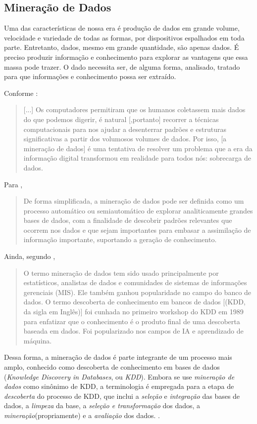 \subsection{Mineração de Dados}\label{mineracao_dados}
Uma das características de nossa era é produção de dados em grande volume, velocidade e variedade de todas as formas, por dispositivos espalhados em toda parte. Entretanto, dados, mesmo em grande quantidade, são apenas dados. É preciso produzir informação e conhecimento para explorar as vantagens que essa massa pode trazer. O dado necessita ser, de alguma forma, analisado, tratado para que informações e conhecimento possa ser extraído. \cite{aprenda_mineracao_fernando_amaral16} \cite{ferrari2017}

Conforme \cite{fayyad1996}:
\begin{quotation}
	[...] Os computadores permitiram que os humanos coletassem mais dados do que podemos digerir, é natural [,portanto] recorrer a técnicas computacionais para nos ajudar a desenterrar padrões e estruturas significativas a partir dos volumosos volumes de dados. Por isso, [a mineração de dados] é uma tentativa de resolver um problema que a era da informação digital transformou em realidade para todos nós: sobrecarga de dados.
\end{quotation}

Para \cite{Boscarioli2017},
\begin{quotation}
	De forma simplificada, a mineração de dados pode ser definida como um processo automático ou semiautomático de explorar analiticamente grandes bases de dados, com a finalidade de descobrir padrões relevantes que ocorrem nos dados e que sejam importantes para embasar a assimilação de informação importante, suportando a geração de conhecimento. 
\end{quotation}

Ainda, segundo \cite{fayyad1996}, 
\begin{quotation}
	O termo mineração de dados tem sido usado principalmente por estatísticos, analistas de dados e comunidades de sistemas de informações gerenciais (MIS). Ele também ganhou popularidade no campo do banco de dados. O termo descoberta de conhecimento em bancos de dados [(KDD, da sigla em Inglês)] foi cunhada no primeiro workshop do KDD em 1989 para enfatizar que o conhecimento é o produto final de uma descoberta baseada em dados. Foi popularizado nos campos de IA e aprendizado de máquina.
\end{quotation}

Dessa forma, a mineração de dados é parte integrante de um processo mais amplo, conhecido como descoberta de conhecimento em bases de dados (\textit{Knowledge Discovery in Databases}, ou \textit{KDD})\cite{fayyad1996}. Embora se use \textit{mineração de dados} como sinônimo de KDD, a terminologia é empregada para a etapa de \textit{descoberta}  do processo de KDD, que inclui a \textit{seleção} e \textit{integração} das bases de dados, a \textit{limpeza} da base, a \textit{seleção e transformação} dos dados, a \textit{mineração}(propriamente) e a \textit{avaliação} dos dados. \cite{ferrari2017}\cite{Boscarioli2017}.

